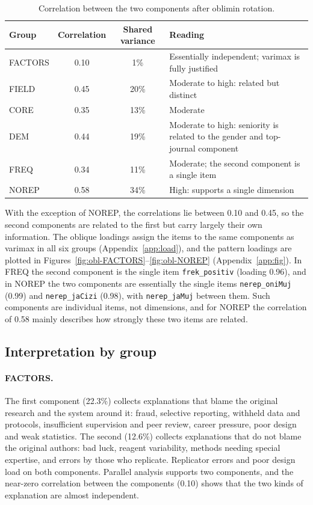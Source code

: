 \documentclass[11pt,a4paper]{article}
\newcommand{\var}[1]{\texttt{#1}}
\begin{document}
\begin{table}[ht]
\centering
\small
\begin{tabular}{@{}l c c L{6.2cm}@{}}
\toprule
Group & Correlation & Shared variance & Reading\\
\midrule
FACTORS & 0.10 & 1\%  & Essentially independent; varimax is fully justified\\
FIELD   & 0.45 & 20\%  & Moderate to high: related but distinct\\
CORE    & 0.35 & 13\%  & Moderate\\
DEM     & 0.44 & 19\%  & Moderate to high: seniority is related to the gender and top-journal component\\
FREQ    & 0.34 & 11\%  & Moderate; the second component is a single item\\
NOREP   & 0.58 & 34\%  & High: supports a single dimension\\
\bottomrule
\end{tabular}
\caption{Correlation between the two components after oblimin rotation.}
\label{tab:phi}
\end{table}

With the exception of NOREP, the correlations lie between 0.10 and 0.45, so the second components are related to the first but carry largely their own information. The oblique loadings assign the items to the same components as varimax in all six groups (Appendix~\ref{app:load}), and the pattern loadings are plotted in Figures~\ref{fig:obl-FACTORS}--\ref{fig:obl-NOREP} (Appendix~\ref{app:fig}). In FREQ the second component is the single item \var{frek\_positiv} (loading 0.96), and in NOREP the two components are essentially the single items \var{nerep\_oniMuj} (0.99) and \var{nerep\_jaCizi} (0.98), with \var{nerep\_jaMuj} between them. Such components are individual items, not dimensions, and for NOREP the correlation of 0.58 mainly describes how strongly these two items are related.

\subsection{Interpretation by group}

\paragraph{FACTORS.} The first component (22.3\%) collects explanations that blame the original research and the system around it: fraud, selective reporting, withheld data and protocols, insufficient supervision and peer review, career pressure, poor design and weak statistics. The second (12.6\%) collects explanations that do not blame the original authors: bad luck, reagent variability, methods needing special expertise, and errors by those who replicate. Replicator errors and poor design load on both components. Parallel analysis supports two components, and the near-zero correlation between the components (0.10) shows that the two kinds of explanation are almost independent.
\end{document}
